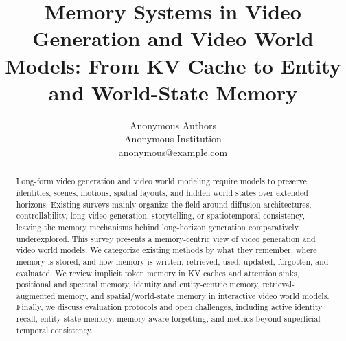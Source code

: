 \documentclass[letterpaper]{article}
\title{Memory Systems in Video Generation and Video World Models: From KV Cache to Entity and World-State Memory}
\author{
    Anonymous Authors\\
    Anonymous Institution\\
    anonymous@example.com
}
\begin{document}
\maketitle

\begin{abstract}
Long-form video generation and video world modeling require models to preserve identities, scenes, motions, spatial layouts, and hidden world states over extended horizons. Existing surveys mainly organize the field around diffusion architectures, controllability, long-video generation, storytelling, or spatiotemporal consistency, leaving the memory mechanisms behind long-horizon generation comparatively underexplored. This survey presents a memory-centric view of video generation and video world models. We categorize existing methods by what they remember, where memory is stored, and how memory is written, retrieved, used, updated, forgotten, and evaluated. We review implicit token memory in KV caches and attention sinks, positional and spectral memory, identity and entity-centric memory, retrieval-augmented memory, and spatial/world-state memory in interactive video world models. Finally, we discuss evaluation protocols and open challenges, including active identity recall, entity-state memory, memory-aware forgetting, and metrics beyond superficial temporal consistency.
\end{abstract}














\end{document}
